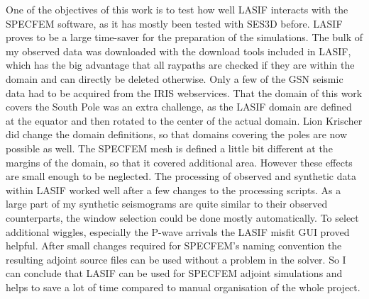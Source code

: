 One of the objectives of this work is to test how well LASIF interacts with the SPECFEM software,
as it has mostly been tested with SES3D before.
LASIF proves to be a large time-saver for the preparation of the simulations. 
The bulk of my observed data was downloaded with the download tools included in LASIF, which 
has the big advantage that all raypaths are checked if they are within the domain and can 
directly be deleted otherwise.
Only a few of the GSN seismic data had to be acquired from the IRIS webservices.
That the domain of this work covers the South Pole was an extra challenge, as the LASIF domain
are defined at the equator and then rotated to the center of the actual domain.
Lion Krischer did change the domain definitions, so that domains covering the poles  are now 
possible as well. 
The SPECFEM mesh is defined a little bit different at the margins of the domain, so that it 
covered additional area. However these effects are small enough to be neglected.
The processing of observed and synthetic data within LASIF worked well after a few changes to
the processing scripts.
As a large part of my synthetic seismograms are quite similar to their observed counterparts,
the window selection could be done mostly automatically. 
To select additional wiggles, especially the P-wave arrivals the LASIF misfit GUI proved helpful.
After small changes required for SPECFEM's naming convention the resulting adjoint source files
can be used without a problem in the solver.
So I can conclude that LASIF can be used for SPECFEM adjoint simulations and helps to save a 
lot of time compared to manual organisation of the whole project.
